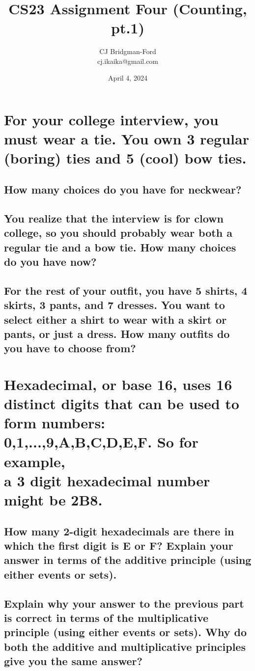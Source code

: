 \documentclass{article}
\title{CS23 Assignment Four (Counting, pt.1)}
\author{CJ Bridgman-Ford \\ cj.ikaika@gmail.com}
\date{April 4, 2024}
\begin{document}
\maketitle
\thispagestyle{empty}


\clearpage

\section{For your college interview, you must wear a tie.
 You own 3 regular (boring) ties and 5 (cool) bow ties.}
\subsection{How many choices do you have for neckwear?}
\subsection{You realize that the interview is for clown college,
 so you should probably wear both a regular tie and a bow tie. How many choices do you have now?}
\subsection{For the rest of your outfit, you have 5 shirts, 4 skirts, 3 pants, and 7 dresses.
 You want to select either a shirt to wear with a skirt or pants, or just a dress.
 How many outfits do you have to choose from?}

\section{Hexadecimal, or base 16, uses 16 distinct digits that can be used to form numbers:
\\ {0,1,...,9,A,B,C,D,E,F}. So for example, \\ a 3 digit hexadecimal number might be 2B8.}
\subsection{How many 2-digit hexadecimals are there in which the first digit is E or F?
 Explain your answer in terms of the additive principle (using either events or sets).}
\subsection{Explain why your answer to the previous part is correct in terms of the
 multiplicative principle (using either events or sets).
 Why do both the additive and multiplicative principles give you the same answer?}
\end{document}
